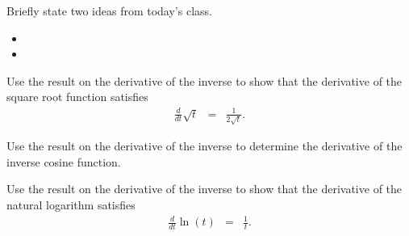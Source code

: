 \begin{problem}
\item Briefly state two ideas from today's class.
  \begin{itemize}
  \item
  \item
  \end{itemize}

\item Use the result on the derivative of the inverse to show that the
  derivative of the square root function satisfies
  \begin{eqnarray*}
    \frac{d}{dt} \sqrt{t} & = & \frac{1}{2\sqrt{t}}.
  \end{eqnarray*}

  \vfill

\item Use the result on the derivative of the inverse to determine the
  derivative of the inverse cosine function.
  \vfill

\item Use the result on the derivative of the inverse to show that the
  derivative of the natural logarithm satisfies
  \begin{eqnarray*}
    \frac{d}{dt} \ln(t) & = & \frac{1}{t}.
  \end{eqnarray*}

  \vfill


\end{problem}




